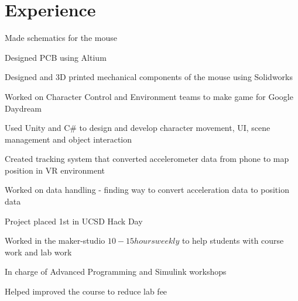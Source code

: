 \documentclass[]{deedy-resume-openfont}
\begin{document}
\hfill
\begin{minipage}[t]{0.66\textwidth} 


\section{Experience}

\sectionsep
\begin{tightemize}
\item Made schematics for the mouse
\item Designed PCB using Altium
\item Designed and 3D printed mechanical components of the mouse using Solidworks
\end{tightemize}
\sectionsep

\begin{tightemize} 
\item Worked on Character Control and Environment teams to make game for Google Daydream
\item Used Unity and C\# to design and develop character movement, UI, scene management and object interaction
\end{tightemize}
\sectionsep

\begin{tightemize}
\item Created tracking system that converted accelerometer data from phone to map position in VR environment
\item Worked on data handling - finding way to convert acceleration data to position data
\item Project placed 1st in UCSD Hack Day
\end{tightemize}
\sectionsep

\begin{tightemize}
\item Worked in the maker-studio \(10-15 hours weekly\) to help students with course work and lab work
\item In charge of Advanced Programming and Simulink workshops
\item Helped improved the course to reduce lab fee
\end{tightemize}
\sectionsep


\end{minipage}
\end{document}
